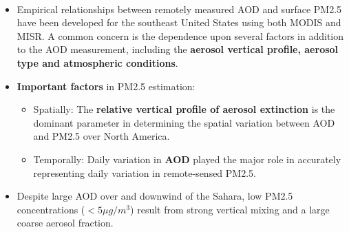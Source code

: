 \documentclass[11pt]{article}
\begin{document}
\paragraph{\citet{van2006estimating}}
\begin{itemize}
    \item Empirical relationships between remotely measured AOD and surface PM2.5 have been developed for the southeast United States using both MODIS and MISR. A common concern is the dependence upon several factors in addition to the AOD measurement, including the \textbf{aerosol vertical profile, aerosol type and atmospheric conditions}. 
    \item \textbf{Important factors} in PM2.5 estimation:  
        \begin{itemize}
            \item Spatially: The \textbf{relative vertical profile of aerosol extinction} is the dominant parameter in determining the spatial variation between AOD and PM2.5 over North America. 
            \item Temporally: Daily variation in \textbf{AOD} played the major role in accurately representing daily variation in remote-sensed PM2.5. 
        \end{itemize}
    \item Despite large AOD over and downwind of the Sahara, low PM2.5 concentrations ($< 5 \mu g/m^3$) result from strong vertical mixing and a large coarse aerosol fraction.
\end{itemize}
\end{document}
